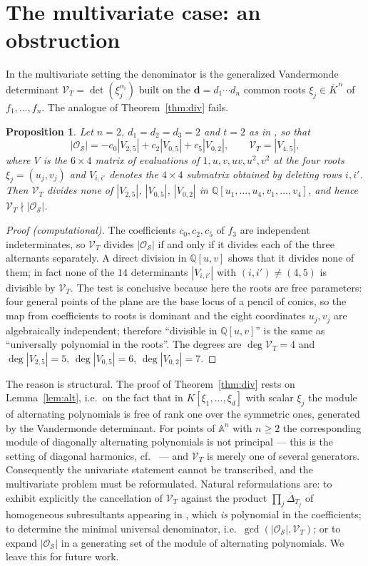 \documentclass[11pt,reqno]{amsart}
\theoremstyle{plain}
\newtheorem{proposition}[theorem]{Proposition}
\theoremstyle{definition}
\newcommand{\cO}{\mathcal{O}}
\newcommand{\cS}{\mathcal{S}}
\newcommand{\cV}{\mathcal{V}}
\newcommand{\QQ}{\mathbb{Q}}
\begin{document}
\section{The multivariate case: an obstruction}\label{sec:multi}

In the multivariate setting \cite[Thm.~3.2]{DKS05} the denominator is the
generalized Vandermonde determinant $\cV_T=\det(\xi_j^{\alpha_i})$ built on the
$\mathbf d=d_1\cdots d_n$ common roots $\xi_j\in\overline K^{\,n}$ of
$f_1,\dots,f_n$. The analogue of Theorem~\ref{thm:div} fails.

\begin{proposition}\label{prop:multi}
Let $n=2$, $d_1=d_2=d_3=2$ and $t=2$ as in \cite[Ex.~3.4]{DKS05}, so that
\[
  |\cO_\cS|=-c_0|V_{2,5}|+c_2|V_{0,5}|+c_5|V_{0,2}|,\qquad \cV_T=|V_{4,5}|,
\]
where $V$ is the $6\times4$ matrix of evaluations of $1,u,v,uv,u^2,v^2$ at the
four roots $\xi_j=(u_j,v_j)$ and $V_{i,i'}$ denotes the $4\times4$ submatrix
obtained by deleting rows $i,i'$. Then $\cV_T$ divides none of $|V_{2,5}|$,
$|V_{0,5}|$, $|V_{0,2}|$ in $\QQ[u_1,\dots,u_4,v_1,\dots,v_4]$, and hence
$\cV_T\nmid|\cO_\cS|$.
\end{proposition}

\begin{proof}[Proof (computational)]
The coefficients $c_0,c_2,c_5$ of $f_3$ are independent indeterminates, so
$\cV_T$ divides $|\cO_\cS|$ if and only if it divides each of the three
alternants separately. A direct division in $\QQ[u,v]$ shows that it divides none
of them; in fact none of the $14$ determinants $|V_{i,i'}|$ with
$(i,i')\ne(4,5)$ is divisible by $\cV_T$. The test is conclusive because here the
roots are free parameters: four general points of the plane are the base locus of
a pencil of conics, so the map from coefficients to roots is dominant and the
eight coordinates $u_j,v_j$ are algebraically independent; therefore
``divisible in $\QQ[u,v]$'' is the same as ``universally polynomial in the
roots''. The degrees are $\deg\cV_T=4$ and $\deg|V_{2,5}|=5$,
$\deg|V_{0,5}|=6$, $\deg|V_{0,2}|=7$.
\end{proof}

The reason is structural. The proof of Theorem~\ref{thm:div} rests on
Lemma~\ref{lem:alt}, i.e.\ on the fact that in $K[\xi_1,\dots,\xi_d]$ with scalar
$\xi_j$ the module of alternating polynomials is free of rank one over the
symmetric ones, generated by the Vandermonde determinant. For points of
$\mathbb{A}^n$ with $n\ge2$ the corresponding module of diagonally alternating
polynomials is not principal --- this is the setting of diagonal harmonics, cf.\
\cite{Haiman} --- and $\cV_T$ is merely one of several generators. Consequently
the univariate statement cannot be transcribed, and the multivariate problem must
be reformulated. Natural reformulations are: to exhibit explicitly the
cancellation of $\cV_T$ against the product $\prod_j\overline\Delta_{T_j}$ of
homogeneous subresultants appearing in \cite[(13)]{DKS05}, which \emph{is}
polynomial in the coefficients; to determine the minimal universal denominator,
i.e.\ $\gcd(|\cO_\cS|,\cV_T)$; or to expand $|\cO_\cS|$ in a generating set of the
module of alternating polynomials. We leave this for future work.
\end{document}
